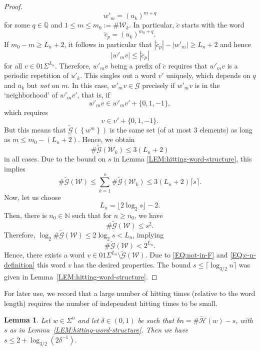 \documentclass[11pt,reqno]{amsart}
\theoremstyle{plain}
\newtheorem{lemma}[theorem]{Lemma}
\theoremstyle{definition}
\newcommand{\Q}{{\mathbb Q}}
\newcommand{\N}{{\mathbb N}}
\newcommand{\mc}{\mathcal}
\begin{document}
\begin{proof}
\[
w'_m = (u_k)^{m+q}
\]
for some $q \in \Q$ and $1\leqslant m \leqslant m_0 := \# \mc W_k$. In particular, $\breve{c}$ starts with the word
\[
\breve{c}_p = (u_k)^{m_0 + q}.
\]
If $m_0 - m \geqslant {L_n} + 2$, it follows in particular that $|\breve{c}_p| - |w'_m| \geqslant {L_n} + 2$ and hence 
\[
|w'_m v| \leqslant |\breve{c}_p|
\]
for all $v \in 01\Sigma^{L_n}$. Therefore, $w'_m v$ being a prefix of $\breve{c}$ requires that $w'_m v$ is a periodic repetition of $u'_k$. This singles out a word $v'$ uniquely, which depends on $q$ and $u_k$ but \emph{not} on $m$. In this case, $w'_m v \in \mc G$ precisely if $w'_m v$ is in the `neighborhood' of $w'_m v'$, that is, if
\[
w'_m v \in w'_m v' + \{0,1,-1\},
\]
which requires
\[
v \in v' + \{0,1,-1\}.
\]
But this means that $\widetilde{\mc G}(\left\{ w^m \right\})$ is the same set (of at most $3$ elements) as long as $m \leqslant m_0 -({L_n}+2)$. Hence, we obtain
\[
\#  \widetilde{\mc G}(\mc W_k) \leqslant 3 ({L_n} + 2)
\]
in all cases. Due to the bound on $s$ in Lemma \ref{LEM:hitting-word-structure}, this implies
\[
\# \widetilde{\mc G}(\mc W) \leqslant \sum_{k=1}^s \# \widetilde{\mc G}(\mc W_k) \leqslant 3 ({L_n} + 2) \lceil  s \rceil.
\]
Now, let us choose
\begin{equation}
\label{EQ:c-n-definition}
{L_n} = \lfloor 2 \log_2  s \rfloor -2.
\end{equation}
Then, there is $n_0 \in \N$ such that for $n \geqslant n_0$, we have
\[
\# \widetilde{\mc G}(\mc W) \leqslant  s^2.
\] 
Therefore, $\log_2 \# \widetilde{\mc G}(\mc W) \leqslant 2 \log_2  s < {L_n} $, implying
\[
\# \widetilde{\mc G}(\mc W) < 2^{L_n}.
\]
Hence, there exists a word $v \in 01\Sigma^{ L_n}\setminus \widetilde{\mc G}(\mc W)$. Due to \eqref{EQ:not-in-F} and \eqref{EQ:c-n-definition} this word $v$ has the desired properties.
The bound $s \leqslant \lceil \log_{3/2} n \rceil$ was given in Lemma~\ref{LEM:hitting-word-structure}.
\end{proof}

For later use, we record that a large number of hitting times (relative to the word length) requires the number of independent hitting times to be small.

\begin{lemma}
\label{LEM:s-hitting-relation}
Let $w \in \Sigma^n$ and let $\delta \in (0,1)$ be such that $\delta n = \# \widetilde{\mc H}(w) - s$, with $s$ as in Lemma~\ref{LEM:hitting-word-structure}. Then we have $s \leqslant 2 + \log_{3/2} (2\delta^{-1})$.
\end{lemma}
\end{document}
